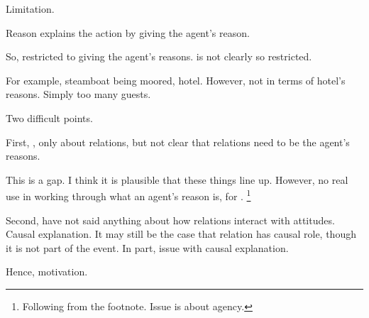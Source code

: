 \begin{note}
  Limitation.

  Reason explains the action by giving the agent's reason.

  So, restricted to giving the agent's reasons.
  \qWhy{} is not clearly so restricted.

  For example, steamboat being moored, hotel.
  However, not in terms of hotel's reasons.
  Simply too many guests.

  Two difficult points.

  First, \qWhy{}, only about relations, but not clear that relations need to be the agent's reasons.

  This is a gap.
  I think it is plausible that these things line up.
  However, no real use in working through what an agent's reason is, for \citeauthor{Davidson:1963aa}.%
  \footnote{
    Following from the footnote.
    Issue is about agency.
  }

  Second, have not said anything about how relations interact with attitudes.
  Causal explanation.
  It may still be the case that relation has causal role, though it is not part of the event.
  In part, issue with causal explanation.
  

  Hence, motivation.
  
\end{note}

